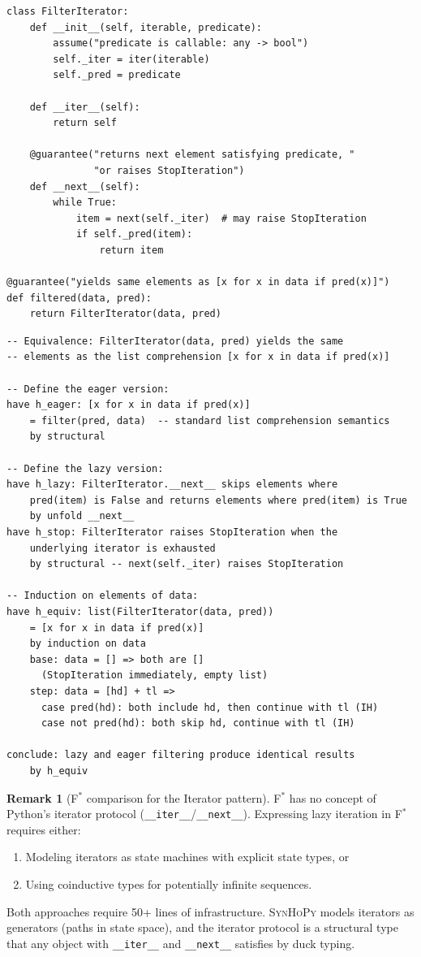 \documentclass[11pt,a4paper]{report}
\theoremstyle{definition}
\newtheorem{remark}[definition]{Remark}
\theoremstyle{plain}
\newcommand{\fstar}{F$^{*}$}
\newcommand{\synhopy}{\textsc{SynHoPy}}
\begin{document}
\begin{lstlisting}[style=synhopy]
class FilterIterator:
    def __init__(self, iterable, predicate):
        assume("predicate is callable: any -> bool")
        self._iter = iter(iterable)
        self._pred = predicate

    def __iter__(self):
        return self

    @guarantee("returns next element satisfying predicate, "
               "or raises StopIteration")
    def __next__(self):
        while True:
            item = next(self._iter)  # may raise StopIteration
            if self._pred(item):
                return item

@guarantee("yields same elements as [x for x in data if pred(x)]")
def filtered(data, pred):
    return FilterIterator(data, pred)
\end{lstlisting}

\begin{lstlisting}[style=proof]
-- Equivalence: FilterIterator(data, pred) yields the same
-- elements as the list comprehension [x for x in data if pred(x)]

-- Define the eager version:
have h_eager: [x for x in data if pred(x)]
    = filter(pred, data)  -- standard list comprehension semantics
    by structural

-- Define the lazy version:
have h_lazy: FilterIterator.__next__ skips elements where
    pred(item) is False and returns elements where pred(item) is True
    by unfold __next__
have h_stop: FilterIterator raises StopIteration when the
    underlying iterator is exhausted
    by structural -- next(self._iter) raises StopIteration

-- Induction on elements of data:
have h_equiv: list(FilterIterator(data, pred))
    = [x for x in data if pred(x)]
    by induction on data
    base: data = [] => both are []
      (StopIteration immediately, empty list)
    step: data = [hd] + tl =>
      case pred(hd): both include hd, then continue with tl (IH)
      case not pred(hd): both skip hd, continue with tl (IH)

conclude: lazy and eager filtering produce identical results
    by h_equiv
\end{lstlisting}

\begin{remark}[\fstar{} comparison for the Iterator pattern]
\fstar{} has no concept of Python's iterator protocol
(\lstinline[style=python]{__iter__}/\lstinline[style=python]{__next__}).
Expressing lazy iteration in \fstar{} requires either:
\begin{enumerate}
  \item Modeling iterators as state machines with explicit state types, or
  \item Using coinductive types for potentially infinite sequences.
\end{enumerate}
Both approaches require 50+ lines of infrastructure.  \synhopy{}
models iterators as generators (paths in state space), and the
iterator protocol is a structural type that any object with
\lstinline[style=python]{__iter__} and \lstinline[style=python]{__next__}
satisfies by duck typing.
\end{remark}
\end{document}
